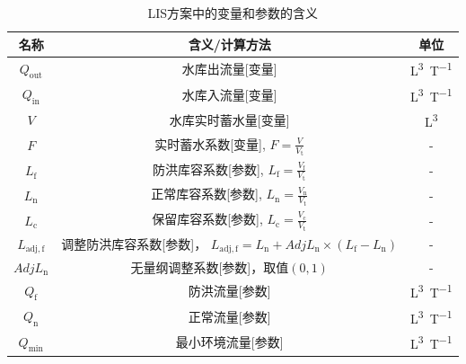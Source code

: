 \begin{table}[htbp]
  \centering
  \caption{LIS方案中的变量和参数的含义}
  \label{tab:LIS方案变量参数表}
  \begin{tabular}{ccc}
    \toprule
    名称                 & 含义/计算方法                                                               & 单位              \\ \midrule
    $Q_{\mathrm{out}}$   & 水库出流量[变量]                                                            & \unit{L^3.T^{-1}} \\
    $Q_{\mathrm{in}}$    & 水库入流量[变量]                                                            & \unit{L^3.T^{-1}} \\
    $V$                  & 水库实时蓄水量[变量]                                                        & \unit{L^3}        \\
    $F$                  & 实时蓄水系数[变量], $F=\frac{V}{V_{\mathrm{t}}}$                            & -                 \\
    $L_{\mathrm{f}}$     & 防洪库容系数[参数], $L_{\mathrm{f}}=\frac{V_{\mathrm{f}}}{V_{\mathrm{t}}}$  & -                 \\
    $L_{\mathrm{n}}$     & 正常库容系数[参数], $L_{\mathrm{n}}=\frac{V_{\mathrm{n}}}{V_{\mathrm{t}}}$  & -                 \\
    $L_{\mathrm{c}}$     & 保留库容系数[参数], $L_{\mathrm{c}}=\frac{V_{\mathrm{c}}}{V_{\mathrm{t}}}$  & -                 \\
    $L_{\mathrm{adj,f}}$ & \makecell{调整防洪库容系数[参数]，                                          \\
    $L_{\mathrm{adj,f}} = L_{\mathrm{n}}+AdjL_{\mathrm{n}} \times \left(L_{\mathrm{f}}-L_{\mathrm{n}}\right)$}
                         & -                                                                           \\
    $AdjL_{\mathrm{n}}$  & 无量纲调整系数[参数]，取值$\left(0,1\right)$                                & -                 \\
    $Q_{\mathrm{f}}$     & 防洪流量[参数]                                                              & \unit{L^3.T^{-1}} \\
    $Q_{\mathrm{n}}$     & 正常流量[参数]                                                              & \unit{L^3.T^{-1}} \\
    $Q_{\mathrm{min}}$   & 最小环境流量[参数]                                                          & \unit{L^3.T^{-1}} \\

\end{tabular}
\end{table}
